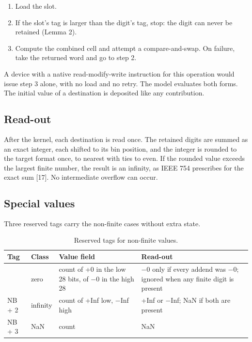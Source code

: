 \documentclass[3p,10pt]{elsarticle}
\begin{document}
\begin{enumerate}
\def\labelenumi{\arabic{enumi}.}
\item
  Load the slot.
\item
  If the slot's tag is larger than the digit's tag, stop: the digit can
  never be retained (Lemma 2).
\item
  Compute the combined cell and attempt a compare-and-swap. On failure,
  take the returned word and go to step 2.
\end{enumerate}

A device with a native read-modify-write instruction for this operation
would issue step 3 alone, with no load and no retry. The model evaluates
both forms. The initial value of a destination is deposited like any
contribution.

\hypertarget{read-out}{%
\subsection{Read-out}\label{read-out}}

After the kernel, each destination is read once. The retained digits are
summed as an exact integer, each shifted to its bin position, and the
integer is rounded to the target format once, to nearest with ties to
even. If the rounded value exceeds the largest finite number, the result
is an infinity, as IEEE 754 prescribes for the exact sum {[}17{]}. No
intermediate overflow can occur.

\hypertarget{special-values}{%
\subsection{Special values}\label{special-values}}

Three reserved tags carry the non-finite cases without extra state.

\begin{table}[!htbp]\centering\small\setlength{\tabcolsep}{4pt}
\caption{Reserved tags for non-finite values.}\label{tab:4}
\begin{tabularx}{\linewidth}{>{\raggedright\arraybackslash\hsize=0.295\hsize}X>{\raggedright\arraybackslash\hsize=0.505\hsize}X>{\raggedright\arraybackslash\hsize=1.600\hsize}X>{\raggedright\arraybackslash\hsize=1.600\hsize}X}
\toprule
Tag & Class & Value field & Read-out \\
\midrule
1 & zero & count of +0 in the low 28 bits, of −0 in the high 28 & −0 only if every addend was −0; ignored when any finite digit is present \\
NB + 2 & infinity & count of +Inf low, −Inf high & +Inf or −Inf; NaN if both are present \\
NB + 3 & NaN & count & NaN \\
\bottomrule
\end{tabularx}
\end{table}
\end{document}
